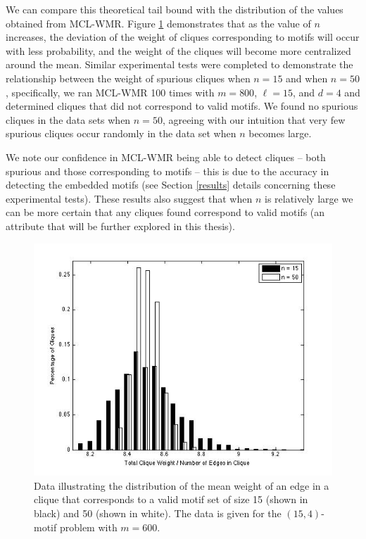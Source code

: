 We can compare this theoretical tail bound with the distribution of the values obtained from MCL-WMR. Figure \ref{chapter4:fig2} demonstrates that as the value of $n$ increases, the deviation of the weight of cliques corresponding to motifs will occur with less probability, and the weight of the cliques will become more centralized around the mean.  Similar experimental tests were completed to demonstrate the relationship between the weight of spurious cliques when $n = 15$ and when $n = 50$, specifically, we ran MCL-WMR 100 times with $m = 800$, $\ell = 15$, and $d = 4$ and determined cliques that did not correspond to valid motifs. We found no spurious cliques in the data sets when $n = 50$, agreeing with our intuition that very few spurious cliques occur randomly in the data set when $n$ becomes large. 

We note our confidence in MCL-WMR being able to detect cliques -- both spurious and those corresponding to motifs -- this is due to the accuracy in detecting the embedded motifs (see Section \ref{results} details concerning these experimental tests).  These results also suggest that when $n$ is relatively large we can be more certain that any cliques found correspond to valid motifs (an attribute that will be further explored in this thesis).  

\begin{figure}[h*]
\begin{center}
 \includegraphics[width=\linewidth]{images/ex_n50a}
\caption[Data illustrating the distribution of the mean weight of an edge in a clique that corresponds to a valid motif set of size 15 and 50.]{Data illustrating the distribution of the mean weight of an edge in a clique that corresponds to a valid motif set  of size 15 (shown in black) and 50 (shown in white). The data is given for the $(15,4)$-motif problem with $m = 600$.  }
\label{chapter4:fig2}
\end{center}
\end{figure}

